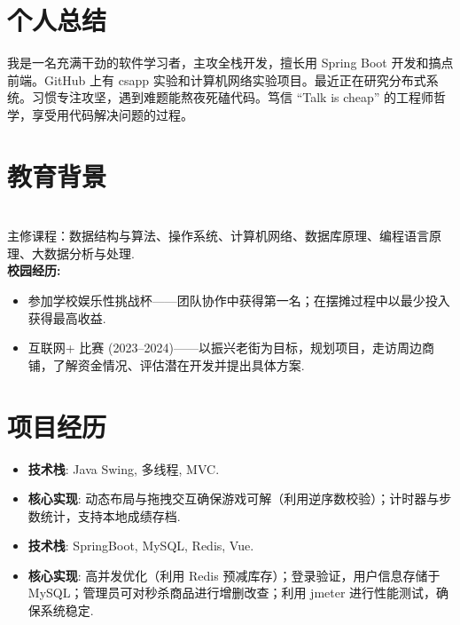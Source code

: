 
\section{个人总结}
我是一名充满干劲的软件学习者，主攻全栈开发，擅长用 Spring Boot 开发和搞点前端。GitHub 上有 csapp 实验和计算机网络实验项目。最近正在研究分布式系统。习惯专注攻坚，遇到难题能熬夜死磕代码。笃信 “Talk is cheap” 的工程师哲学，享受用代码解决问题的过程。

\section{教育背景}
 \\
主修课程：数据结构与算法、操作系统、计算机网络、数据库原理、编程语言原理、大数据分析与处理.\\[0.5ex]
\textbf{校园经历:}
\begin{itemize}[parsep=0.2ex]
  \item 参加学校娱乐性挑战杯——团队协作中获得第一名；在摆摊过程中以最少投入获得最高收益.
  \item 互联网+ 比赛 (2023--2024)——以振兴老街为目标，规划项目，走访周边商铺，了解资金情况、评估潜在开发并提出具体方案.
\end{itemize}

\section{项目经历}
\begin{itemize}[parsep=0.2ex]
  \item \textbf{技术栈}: Java Swing, 多线程, MVC.
  \item \textbf{核心实现}: 动态布局与拖拽交互确保游戏可解（利用逆序数校验）；计时器与步数统计，支持本地成绩存档.
\end{itemize}

\begin{itemize}[parsep=0.2ex]
  \item \textbf{技术栈}: SpringBoot, MySQL, Redis, Vue.
  \item \textbf{核心实现}: 高并发优化（利用 Redis 预减库存）；登录验证，用户信息存储于 MySQL；管理员可对秒杀商品进行增删改查；利用 jmeter 进行性能测试，确保系统稳定.
\end{itemize}

